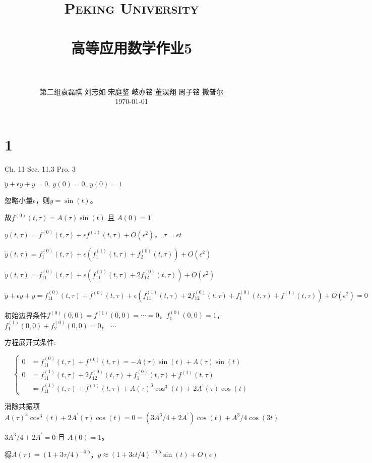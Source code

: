 \documentclass[12pt]{article}
\title{
		\vspace{-1in} 	
		\usefont{OT1}{bch}{b}{n}
		\normalfont \normalsize \textsc{\LARGE Peking University}\\[1cm] %
		\horrule{0.5pt} \\[0.5cm]
		\huge \bfseries{高等应用数学作业5} \\
		\horrule{2pt} \\[0.5cm]
}
\author{
		\normalfont 								\normalsize
		第二组\quad 袁磊祺 \quad 刘志如 \quad 宋庭鉴 \quad 岐亦铭 \quad 董淏翔 \quad 周子铭 \quad 撒普尔\\	\normalsize
        \today
}
\date{}
\begin{document}


\maketitle

\section{1}
Ch. 11 Sec. 11.3 Pro. 3

$\ddot{y} + \epsilon\dot{y} + y = 0,\ y(0)=0,\ \dot{y}(0)=1$

忽略小量$\epsilon$，则$y=\sin(t)$。

故$f^{(0)}(t,\tau) = A(\tau) \sin(t)$ 且 $A(0)=1$

$y(t,\tau) = f^{(0)}(t,\tau) + \epsilon f^{(1)}(t,\tau) + O(\epsilon^2)$， $\tau = \epsilon t$

$\dot{y}(t,\tau) = f^{(0)}_1(t,\tau) + \epsilon ( f^{(1)}_1(t,\tau) + f^{(0)}_2(t,\tau) ) +O(\epsilon^2)$

$\ddot{y}(t,\tau) = f^{(0)}_{11}(t,\tau) + \epsilon ( f^{(1)}_{11}(t,\tau) + 2f^{(0)}_{12}(t,\tau) ) + O(\epsilon^2)$

$\ddot{y} + \epsilon\dot{y} + y = f^{(0)}_{11}(t,\tau) + f^{(0)}(t,\tau) + \epsilon ( f^{(1)}_{11}(t,\tau) + 2f^{(0)}_{12}(t,\tau) + f^{(0)}_1(t,\tau) + f^{(1)}(t,\tau) )  + O(\epsilon^2) = 0 $

初始边界条件$f^{(0)}(0,0)=f^{(1)}(0,0)=\cdots=0$，$f^{(0)}_1(0,0)=1$，$f^{(1)}_1(0,0)+f^{(0)}_2(0,0)=0$， $\cdots$

方程展开式条件:

\begin{equation}
	\left\{
	\begin{array}{lll}
	0&=f^{(0)}_{11}(t,\tau) + f^{(0)}(t,\tau)=-A(\tau) \sin(t) + A(\tau) \sin(t)\\
	0&=f^{(1)}_{11}(t,\tau) + 2f^{(0)}_{12}(t,\tau) + f^{(0)}_1(t,\tau) + f^{(1)}(t,\tau)\\
	&=f^{(1)}_{11}(t,\tau) + f^{(1)}(t,\tau) + A(\tau)^3 \cos^3(t) + 2A^\prime(\tau) \cos(t)
	\end{array}
	\right.
\end{equation}


消除共振项$A(\tau)^3 \cos^3(t) + 2A^\prime(\tau) \cos(t) = 0 =(3A^3/4+2A^\prime)\cos(t) + A^3/4 \cos(3t)$

$3A^3/4+2A^\prime=0$ 且 $A(0)=1$。

得$A(\tau)=(1+3\tau/4)^{-0.5}$，$y \approx (1+3\epsilon t/4)^{-0.5} \sin(t) + O(\epsilon)$
\end{document}
